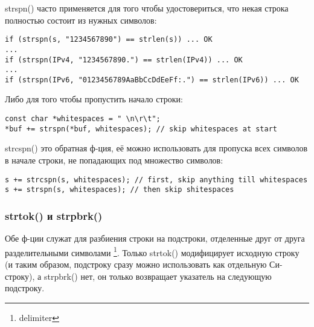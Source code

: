 strspn() часто применяется для того чтобы удостовериться, что некая строка полностью состоит из
нужных символов:
    
\begin{lstlisting}
if (strspn(s, "1234567890") == strlen(s)) ... OK
...
if (strspn(IPv4, "1234567890.") == strlen(IPv4)) ... OK
...
if (strspn(IPv6, "0123456789AaBbCcDdEeFf:.") == strlen(IPv6)) ... OK
\end{lstlisting}

Либо для того чтобы пропустить начало строки:

\begin{lstlisting}
const char *whitespaces = " \n\r\t";
*buf += strspn(*buf, whitespaces); // skip whitespaces at start
\end{lstlisting}

strcspn() это обратная ф-ция, её можно использовать для пропуска всех символов в начале строки, не попадающих
под множество символов:

\begin{lstlisting}
s += strcspn(s, whitespaces); // first, skip anything till whitespaces
s += strspn(s, whitespaces); // then skip shitespaces
\end{lstlisting}

\subsubsection{strtok() и strpbrk()}

Обе ф-ции служат для разбиения строки на подстроки, отделенные друг от друга разделительными символами
\footnote{delimiter}.
Только strtok() модифицирует исходную строку (и таким образом, подстроку сразу можно использовать
как отдельную Си-строку), а strpbrk() нет, он только возвращает указатель на следующую подстроку.

